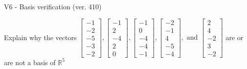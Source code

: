 \begin{exercise}
  \begin{exerciseTitle}V6 - Basis verification (ver. 410)\end{exerciseTitle}
  \begin{exerciseStatement}
    Explain why the vectors \(\left[\begin{array}{r}
-1 \\
-2 \\
-5 \\
-3 \\
-2
\end{array}\right] , \left[\begin{array}{r}
-1 \\
2 \\
-4 \\
2 \\
0
\end{array}\right] , \left[\begin{array}{r}
-1 \\
0 \\
-4 \\
-4 \\
-1
\end{array}\right] , \left[\begin{array}{r}
-2 \\
-1 \\
4 \\
-5 \\
-4
\end{array}\right] , \text{ and } \left[\begin{array}{r}
2 \\
4 \\
-2 \\
3 \\
-2
\end{array}\right]\) are or are not a basis of \(\mathbb{R}^5\)	



\end{exerciseStatement}
\end{exercise}

